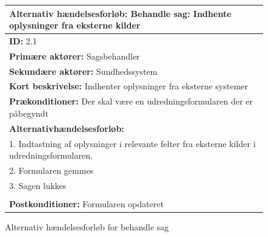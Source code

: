 \begin{figure} [htb!]
\begin{longtable}{|p{18cm}|}
\hline
\textbf{Alternativ hændelsesforløb:} Behandle sag: Indhente oplysninger fra eksterne kilder \\
\hline
\textbf{ID:} 2.1 \\
\hline
\textbf{Primære aktører:} Sagsbehandler\\
\hline
\textbf{Sekundære aktører:} Sundhedssystem \\
\hline
\textbf{Kort beskrivelse: }Indhenter oplysninger fra eksterne systemer\\
\hline
\textbf{Prækonditioner: }Der skal være en udredningsformularen der er påbegyndt\\
\hline
\textbf{Alternativhændelsesforløb:}\\
1. Indtastning af oplysninger i relevante felter fra eksterne kilder i udredningsformularen.\\
2. Formularen gemmes\\
3. Sagen lukkes\\
\\
\hline
\textbf{Postkonditioner:} Formularen opdateret \\
\hline
\end{longtable}
\caption{Alternativ hændelsesforløb for behandle sag}
\label{tab:2.1}
\end{figure}

